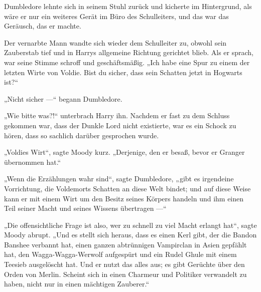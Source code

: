 Dumbledore lehnte sich in seinem Stuhl zurück und kicherte im Hintergrund, als wäre er nur ein weiteres Gerät im Büro des Schulleiters, und das war das Geräusch, das er machte.

Der vernarbte Mann wandte sich wieder dem Schulleiter zu, obwohl sein Zauberstab tief und in Harrys allgemeine Richtung gerichtet blieb. Als er sprach, war seine Stimme schroff und geschäftsmäßig.
„Ich habe eine Spur zu einem der letzten Wirte von Voldie. Bist du sicher, dass sein Schatten jetzt in Hogwarts ist?“

„Nicht sicher —“ begann Dumbledore.

„Wie bitte was?!“ unterbrach Harry ihn.
Nachdem er fast zu dem Schluss gekommen war, dass der Dunkle Lord nicht existierte, war es ein Schock zu hören, dass so sachlich darüber gesprochen wurde.

„Voldies Wirt“, sagte Moody kurz.
„Derjenige, den er besaß, bevor er Granger übernommen hat.“

„Wenn die Erzählungen wahr sind“, sagte Dumbledore, „gibt es irgendeine Vorrichtung, die Voldemorts Schatten an diese Welt bindet; und auf diese Weise kann er mit einem Wirt um den Besitz seines Körpers handeln und ihm einen Teil seiner Macht und seines Wissens übertragen —“

„Die offensichtliche Frage ist also, wer zu schnell zu viel Macht erlangt hat“, sagte Moody abrupt.
„Und es stellt sich heraus, dass es einen Kerl gibt, der die Bandon Banshee verbannt hat, einen ganzen abtrünnigen Vampirclan in Asien gepfählt hat, den Wagga-Wagga-Werwolf aufgespürt und ein Rudel Ghule mit einem Teesieb ausgelöscht hat. Und er nutzt das alles aus; es gibt Gerüchte über den Orden von Merlin. Scheint sich in einen Charmeur und Politiker verwandelt zu haben, nicht nur in einen mächtigen Zauberer.“

